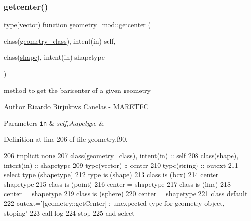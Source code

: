 \subsubsection{\texorpdfstring{getcenter()}{getcenter()}}
{\footnotesize\ttfamily type(vector) function geometry\+\_\+mod\+::getcenter (\begin{DoxyParamCaption}\item[{class(\mbox{\hyperlink{structgeometry__mod_1_1geometry__class}{geometry\+\_\+class}}), intent(in)}]{self,  }\item[{class(\mbox{\hyperlink{structgeometry__mod_1_1shape}{shape}}), intent(in)}]{shapetype }\end{DoxyParamCaption})\hspace{0.3cm}{\ttfamily [private]}}



method to get the baricenter of a given geometry 

\begin{DoxyAuthor}{Author}
Ricardo Birjukovs Canelas -\/ M\+A\+R\+E\+T\+EC 
\end{DoxyAuthor}

\begin{DoxyParams}[1]{Parameters}
\mbox{\tt in}  & {\em self,shapetype} & \\
\hline
\end{DoxyParams}


Definition at line 206 of file geometry.\+f90.


\begin{DoxyCode}
206     \textcolor{keywordtype}{implicit none}
207     \textcolor{keywordtype}{class}(geometry\_class), \textcolor{keywordtype}{intent(in)} :: self
208     \textcolor{keywordtype}{class}(shape), \textcolor{keywordtype}{intent(in)} :: shapetype
209     \textcolor{keywordtype}{type}(vector) :: center
210     \textcolor{keywordtype}{type}(string) :: outext
211     \textcolor{keywordflow}{select type} (shapetype)
212 \textcolor{keywordflow}{    type is} (shape)
213 \textcolor{keywordflow}{    class is} (box)
214         center = shapetype%
215 \textcolor{keywordflow}{    class is} (point)
216         center = shapetype%
217 \textcolor{keywordflow}{    class is} (line)
218         center = shapetype%
219 \textcolor{keywordflow}{    class is} (sphere)
220         center = shapetype%
221 \textcolor{keywordflow}{        class default}
222         outext=\textcolor{stringliteral}{'[geometry::getCenter] : unexpected type for geometry object, stoping'}
223         \textcolor{keyword}{call }log%
224         stop
225 \textcolor{keywordflow}{    end select}
\end{DoxyCode}
\mbox{\label{namespacegeometry__mod_a524c5d28a80fb6729b102126485605ce}} 
